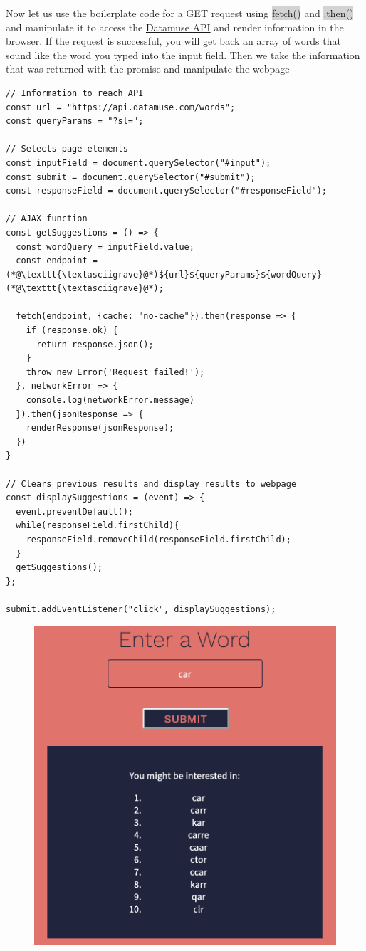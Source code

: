 \documentclass[11pt]{article}
\begin{document}
Now let us use the boilerplate code for a GET request using \colorbox{lightgray}{fetch()} and \colorbox{lightgray}{.then()} and manipulate it to access the \href{https://www.datamuse.com/api/}{Datamuse API} and render information in the browser. If the request is successful, you will get back an array of words that sound like the word you typed into the input field. Then we take the information that was returned with the promise and manipulate the webpage
\begin{lstlisting}
// Information to reach API
const url = "https://api.datamuse.com/words";
const queryParams = "?sl=";

// Selects page elements
const inputField = document.querySelector("#input");
const submit = document.querySelector("#submit");
const responseField = document.querySelector("#responseField");

// AJAX function
const getSuggestions = () => {
  const wordQuery = inputField.value;
  const endpoint = (*@\texttt{\textasciigrave}@*)${url}${queryParams}${wordQuery}(*@\texttt{\textasciigrave}@*);
  
  fetch(endpoint, {cache: "no-cache"}).then(response => {
    if (response.ok) {
      return response.json();
    }
    throw new Error('Request failed!');
  }, networkError => {
    console.log(networkError.message)
  }).then(jsonResponse => {
    renderResponse(jsonResponse); 
  })
}

// Clears previous results and display results to webpage
const displaySuggestions = (event) => {
  event.preventDefault();
  while(responseField.firstChild){
    responseField.removeChild(responseField.firstChild);
  }
  getSuggestions();
};

submit.addEventListener("click", displaySuggestions);
\end{lstlisting}
\begin{figure}[H]
\includegraphics[scale = 0.6]{18_2}
\centering
\end{figure}
\end{document}
